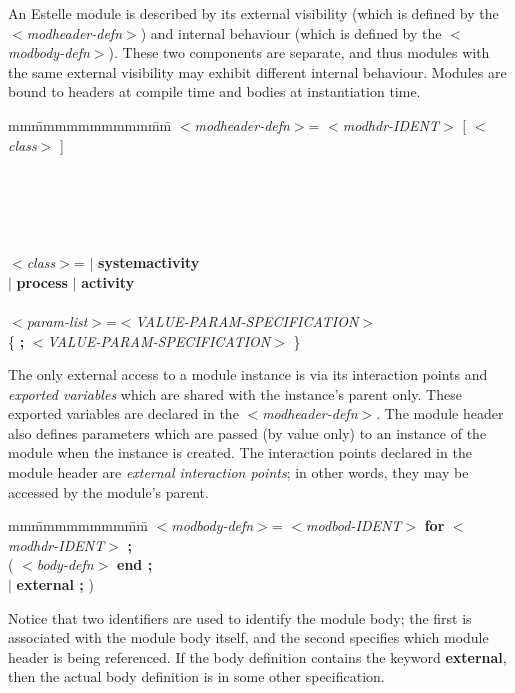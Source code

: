 An Estelle module is described by its external visibility
(which is defined by the $<${\em modheader-defn}$>$) and internal 
behaviour (which is defined by the $<${\em modbody-defn}$>$).
These two components are separate, and thus modules with the
same external visibility may exhibit different internal
behaviour. Modules are bound to headers at compile time and bodies at
instantiation time.

\begin{tabbing}
mm\=mmmmmmmmmm\=mm\=\+\kill
$<${\em modheader-defn}$>$\>=
 $<${\em modhdr-IDENT}$>$ [ $<${\em class}$>$ ]\\
\>\\
\>\>[ {\bf ip} +\{ $<${\em ip-decl}$>$ {\bf ;} \} ]\\
\>\\
\>\\
\mbox{}\\
$<${\em class}$>$\>= $|$ {\bf systemactivity}\\
\>\>$|$ {\bf process} $|$ {\bf activity}\\
\mbox{}\\
$<${\em param-list}$>$\>=\>$<${\em VALUE-PARAM-SPECIFICATION}$>$\\
\>\>\{ {\bf ;} $<${\em VALUE-PARAM-SPECIFICATION}$>$ \}
\end{tabbing}

The only external access to a module instance is via its
interaction points and {\em exported variables} which are shared
with the instance's parent only. These exported variables
are declared in the $<${\em modheader-defn}$>$. The module header
also defines parameters which are passed (by value only) to
an instance of the module when the instance is created. The
interaction points declared in the module header are
{\em external interaction points}; in other words, they may be
accessed by the module's parent.

\begin{tabbing}
mm\=mmmmmmmm\=mm\=\+\kill
$<${\em modbody-defn}$>$=\> $<${\em modbod-IDENT}$>$ {\bf for} $<${\em
modhdr-IDENT}$>$ {\bf ;}\\
\>\>( $<${\em body-defn}$>$ {\bf end ;}\\
\>\>$|$ {\bf external ;} )
\end{tabbing}

Notice that two identifiers are used to identify the
module body; the first is associated with the module body
itself, and the second specifies which module header is
being referenced. If the body definition contains the
keyword {\bf external}, then the actual body definition is in some
other specification.

